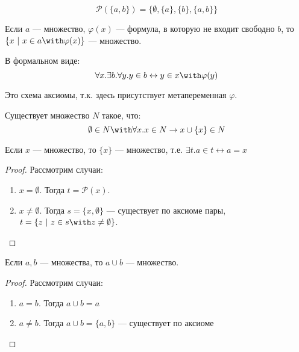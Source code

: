 \begin{example}
    \[\mathcal{P}(\{a, b\}) = \{\emptyset, \{a\}, \{b\}, \{a, b\}\}\]
\end{example}

\begin{axiom}[выделения]
    Если \(a\) --- множество, \(\varphi(x)\) --- формула, в которую не входит свободно \(b\), то \(\{x\ |\ x \in a \with \varphi(x)\}\) --- множество.

    В формальном виде:
    \[\forall x.\exists b.\forall y.y \in b \leftrightarrow y \in x \with \varphi(y)\]

    \begin{remark}
        Это схема аксиомы, т.к. здесь присутствует метапеременная \(\varphi\).
    \end{remark}
\end{axiom}

\begin{axiom}[бесконечности]
    Существует множество \(N\) такое, что:
    \[\emptyset \in N \with \forall x.x \in N \to x \cup \{x\} \in N\]
\end{axiom}

\begin{theorem}
    \label{множество x}
    Если \(x\) --- множество, то \(\{x\}\) --- множество, т.е. \(\exists t.a \in t \leftrightarrow a = x\)
\end{theorem}
\begin{proof}
    Рассмотрим случаи:
    \begin{enumerate}
        \item \(x = \emptyset\). Тогда \(t = \mathcal{P}(x)\).
        \item \(x \neq \emptyset\). Тогда \(s = \{x, \emptyset\}\) --- существует по аксиоме пары, \(t = \{z\ |\ z \in s \with z \neq \emptyset\}\).
    \end{enumerate}
\end{proof}

\begin{theorem}
    Если \(a, b\) --- множества, то \(a \cup b\) --- множество.
\end{theorem}

\begin{proof}
    Рассмотрим случаи:
    \begin{enumerate}
        \item \(a = b\). Тогда \(a \cup b = a\)
        \item \(a \neq b\). Тогда \(a \cup b = \{a, b\}\) --- существует по аксиоме 
    \end{enumerate}
\end{proof}

